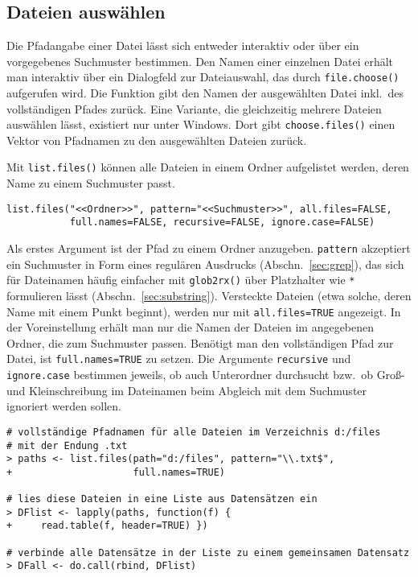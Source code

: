 \subsection{Dateien auswählen}
\label{sec:filesSelect}

Die Pfadangabe einer Datei lässt sich entweder interaktiv oder über ein vorgegebenes Suchmuster bestimmen. Den Namen einer einzelnen Datei erhält man interaktiv über ein Dialogfeld zur Dateiauswahl, das durch \lstinline!file.choose()! aufgerufen wird. Die Funktion gibt den Namen der ausgewählten Datei inkl.\ des vollständigen Pfades zurück. Eine Variante, die gleichzeitig mehrere Dateien auswählen lässt, existiert nur unter Windows. Dort gibt \lstinline!choose.files()! einen Vektor von Pfadnamen zu den ausgewählten Dateien zurück.

Mit \lstinline!list.files()! können alle Dateien in einem Ordner aufgelistet werden, deren Name zu einem Suchmuster passt.
\begin{lstlisting}
list.files("<<Ordner>>", pattern="<<Suchmuster>>", all.files=FALSE,
           full.names=FALSE, recursive=FALSE, ignore.case=FALSE)
\end{lstlisting}

Als erstes Argument ist der Pfad zu einem Ordner anzugeben. \lstinline!pattern! akzeptiert ein Suchmuster in Form eines regulären Ausdrucks (Abschn.\ \ref{sec:grep}), das sich für Dateinamen häufig einfacher mit \lstinline!glob2rx()! über Platzhalter wie \lstinline!*! formulieren lässt (Abschn.\ \ref{sec:substring}). Versteckte Dateien (etwa solche, deren Name mit einem Punkt beginnt), werden nur mit \lstinline!all.files=TRUE! angezeigt. In der Voreinstellung erhält man nur die Namen der Dateien im angegebenen Ordner, die zum Suchmuster passen. Benötigt man den vollständigen Pfad zur Datei, ist \lstinline!full.names=TRUE! zu setzen. Die Argumente \lstinline!recursive! und \lstinline!ignore.case! bestimmen jeweils, ob auch Unterordner durchsucht bzw.\ ob Groß- und Kleinschreibung im Dateinamen beim Abgleich mit dem Suchmuster ignoriert werden sollen.
\begin{lstlisting}
# vollständige Pfadnamen für alle Dateien im Verzeichnis d:/files
# mit der Endung .txt
> paths <- list.files(path="d:/files", pattern="\\.txt$",
+                     full.names=TRUE)

# lies diese Dateien in eine Liste aus Datensätzen ein
> DFlist <- lapply(paths, function(f) {
+     read.table(f, header=TRUE) })

# verbinde alle Datensätze in der Liste zu einem gemeinsamen Datensatz
> DFall <- do.call(rbind, DFlist)
\end{lstlisting}

